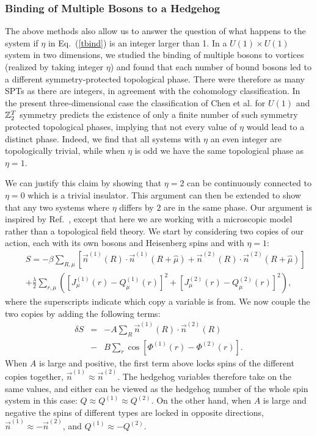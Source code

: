 \subsubsection{Binding of Multiple Bosons to a Hedgehog}
The above methods also allow us to answer the question of what happens to the system if $\eta$ in Eq.~(\ref{tbind}) is an integer larger than 1.  In a $U(1)\times U(1)$ system in two dimensions, we studied the binding of multiple bosons to vortices (realized by taking integer $\eta$) and found that each number of bound bosons led to a different symmetry-protected topological phase.\cite{FQHE} There were therefore as many SPTs as there are integers, in agreement with the cohomology classification.\cite{WenScience,*WenPRB, LuVishwanath} In the present three-dimensional case the classification of Chen et al.\cite{WenScience,*WenPRB} for $U(1)$ and $\mathbb{Z}_2^T$ symmetry predicts the existence of only a finite number of such symmetry protected topological phases, implying that not every value of $\eta$ would lead to a distinct phase. Indeed, we find that all systems with $\eta$ an even integer are topologically trivial, while when $\eta$ is odd we have the same topological phase as $\eta=1$. 

We can justify this claim by showing that $\eta=2$ can be continuously connected to $\eta=0$ which is a trivial insulator. This argument can then be extended to show that any two systems where $\eta$ differs by $2$ are in the same phase.  Our argument is inspired by Ref.~\cite{BiRasmussenXu13}, except that here we are working with a microscopic model rather than a topological field theory.
We start by considering two copies of our action, each with its own bosons and Heisenberg spins and with $\eta=1$:
\begin{eqnarray}
&&S=-\beta\sum_{R,\mu}\left[ \vec{n}^{(1)}(R)\cdot \vec{n}^{(1)}(R+\hat{\mu})+\vec{n}^{(2)}(R)\cdot \vec{n}^{(2)}(R+\hat{\mu})\right]\nonumber\\
&&+\frac{\lambda}{2}\sum_{r,\mu}\left( [ J_\mu^{(1)}(r)- Q_\mu^{(1)}(r)]^2+[ J_\mu^{(2)}(r)- Q_\mu^{(2)}(r)]^2\right),
\label{doubleaction}
\end{eqnarray}
where the superscripts indicate which copy a variable is from.  We now couple the two copies by adding the following terms:
\begin{eqnarray}
\delta S&=&-A\sum_{R} \vec{n}^{(1)}(R)\cdot \vec{n}^{(2)}(R)\nonumber\\
&-&B\sum_{r} \cos[\Phi^{(1)}(r)-\Phi^{(2)}(r)].
\label{AB}
\end{eqnarray} 
When $A$ is large and positive, the first term above locks spins of the different copies together, $\vec{n}^{(1)}\approx\vec{n}^{(2)}$. The hedgehog variables therefore take on the same values, and either can be viewed as the hedgehog number of the whole spin system in this case: $Q \approx Q^{(1)} \approx Q^{(2)}$. On the other hand, when $A$ is large and negative the spins of different types are locked in opposite directions,  $\vec{n}^{(1)}\approx -\vec{n}^{(2)}$, and $Q^{(1)} \approx -Q^{(2)}$.

